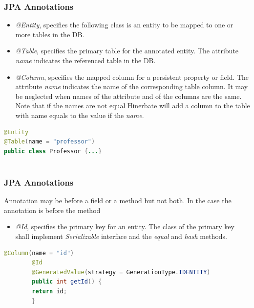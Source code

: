 \documentclass{beamer}
\begin{document}
\begin{frame} [fragile]
\frametitle{JPA Annotations}
\begin{itemize}
\item \textit{@Entity}, specifies the following class is an entity to be mapped to one or more tables in the DB.
\item \textit{@Table}, specifies the primary table for the annotated entity. The attribute \textit{name} indicates the referenced table in the DB.
\item \textit{@Column}, specifies the mapped column for a persistent property or field. The attribute \textit{name} indicates the name of the corresponding table column. It may be neglected when names of the attribute and of the columns are the same. \alert{Note} that if the names are not equal Hinerbate will add a column to the table with name equals to the value if the \textit{name}.
\end{itemize}
\begin{lstlisting}[language=Java, caption=@Entity and @Table]
@Entity
@Table(name = "professor")
public class Professor {...}
	
\end{lstlisting}
\end{frame}

\begin{frame}[fragile]
	\frametitle{JPA Annotations}
	Annotation may be before a field or a method but not both. In the case the annotation is before the method
	\begin{itemize}
		\item \textit{@Id}, specifies the primary key for an entity. The class of the primary key shall implement \textit{Serializable} interface and the \textit{equal} and \textit{hash} methods.
	\end{itemize}
	\begin{lstlisting}[language=java, caption=@Id @Column and @GeneratedValue]
		@Column(name = "id")
		@Id
		@GeneratedValue(strategy = GenerationType.IDENTITY)
		public int getId() {
		return id;
		}
	\end{lstlisting}
\end{frame}
\end{document}
